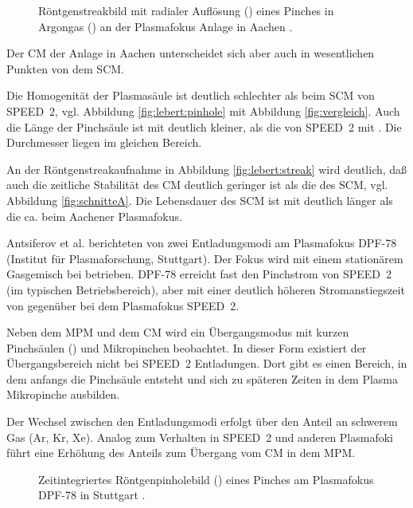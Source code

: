 \begin{figure}[H]
  \center
  \caption{Röntgenstreakbild mit radialer Auflösung ()
     eines Pinches in Argongas () an der Plasmafokus Anlage
     in Aachen \cite{lebert:95}.}
  \label{fig:lebert:streak}
\end{figure}
%
\par
Der CM der Anlage in Aachen unterscheidet sich aber auch in
wesentlichen Punkten von dem SCM.
\par
Die Homogenität der Plasmasäule ist deutlich schlechter als beim
SCM von SPEED~2, vgl. Abbildung \vref{fig:lebert:pinhole} mit
Abbildung \vref{fig:vergleich}. Auch die Länge der Pinchsäule ist
mit  deutlich kleiner, als die von SPEED~2 mit
. Die Durchmesser liegen im gleichen Bereich.
\par
An der Röntgenstreakaufnahme in Abbildung \vref{fig:lebert:streak} wird
deutlich, daß auch die zeitliche Stabilität des CM deutlich geringer
ist als die des SCM, vgl. Abbildung \vref{fig:schnitteA}. Die
Lebensdauer des SCM ist mit  deutlich länger als die
ca.  beim Aachener Plasmafokus.
\par
Antsiferov et al. \cite{antsiferov:95} berichteten von zwei
Entladungsmodi am Plasmafokus DPF-78 (Institut für
Plasmaforschung, Stuttgart). Der Fokus wird mit einem stationärem
Gasgemisch bei  betrieben. DPF-78 erreicht fast den
Pinchstrom von SPEED~2 (im typischen Betriebsbereich), aber mit
einer deutlich höheren Stromanstiegszeit von 
gegenüber  bei dem Plasmafokus SPEED~2.
\par
Neben dem MPM und dem CM wird ein Übergangsmodus mit kurzen Pinchsäulen
() und Mikropinchen beobachtet. In dieser Form existiert
der Übergangsbereich nicht bei SPEED~2 Entladungen. Dort gibt es einen
Bereich, in dem anfangs die Pinchsäule entsteht und sich zu späteren
Zeiten in dem Plasma Mikropinche ausbilden.
\par
Der Wechsel zwischen den Entladungsmodi erfolgt über den Anteil an
schwerem Gas (Ar, Kr, Xe). Analog zum Verhalten in SPEED~2 und anderen
Plasmafoki führt eine Erhöhung des Anteils zum Übergang vom CM in dem
MPM.
%
\par
\begin{figure}[H]
  \center
  \caption{Zeitintegriertes  Röntgenpinholebild () eines Pinches
           am Plasmafokus DPF-78 in Stuttgart \cite{antsiferov:95}.}
  \label{fig:antsiferov:pinhole}
\end{figure}

